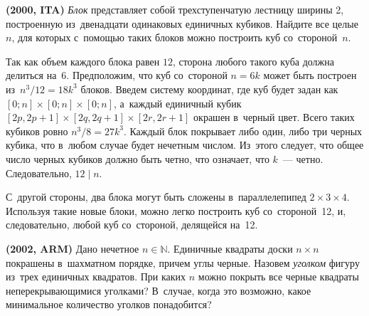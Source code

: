\begin{problems}

\item\textbf{(2000, ITA)}
\emph{Блок} представляет собой трехступенчатую лестницу ширины 2, построенную
из~двенадцати одинаковых единичных кубиков.
Найдите все целые $n$, для которых с~помощью таких блоков можно построить куб
со~стороной~$n$.

\end{problems}

\ifincludesolutions
Так как объем каждого блока равен $12$, сторона любого такого куба должна
делиться на~$6$.
Предположим, что куб со~стороной $n = 6 k$ может быть построен
из~$n^3 / 12 = 18 k^3$ блоков.
Введем систему координат, где куб будет задан как
$[0; n] \times [0; n] \times [0; n]$,
а~каждый единичный кубик
$[2 p, 2 p + 1] \times[2 q, 2 q + 1] \times[2 r, 2 r + 1]$ окрашен
в~черный цвет.
Всего таких кубиков ровно $n^3 / 8 = 27 k^3$.
Каждый блок покрывает либо один, либо три черных кубика, что в~любом случае
будет нечетным числом.
Из~этого следует, что общее число черных кубиков должно быть четно, что
означает, что $k$~--- четно.
Следовательно, $12 \mid n$.
\par
С~другой стороны, два блока могут быть сложены в~параллелепипед
$2 \times 3 \times 4$.
Используя такие новые блоки, можно легко построить куб со~стороной~12, и,
следовательно, любой куб со~стороной, делящейся на~12.
\fi %

\begin{problems}

\item\textbf{(2002, ARM)}%
\label{combinatorics/cutting-gX:2002-ARM:problem}
Дано нечетное $n \in \mathbb{N}$.
Единичные квадраты доски $n \times n$ покрашены в~шахматном порядке, причем
углы черные.
Назовем \emph{уголком} фигуру
из~трех единичных квадратов.
При каких $n$ можно покрыть все черные квадраты неперекрывающимися уголками?
В~случае, когда это возможно, какое минимальное количество уголков понадобится?

\end{problems}


